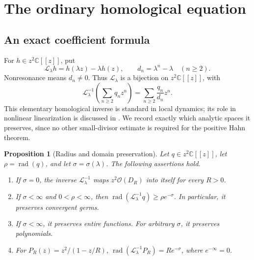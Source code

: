 \documentclass[11pt,a4paper]{article}
\numberwithin{equation}{section}
\newtheorem{proposition}[theorem]{Proposition}
\theoremstyle{definition}
\theoremstyle{remark}
\newcommand{\C}{\mathbb C}
\newcommand{\LL}{\mathcal L}
\newcommand{\rad}{\operatorname{rad}}
\begin{document}
\section{The ordinary homological equation}\label{sec:homological}

\subsection{An exact coefficient formula}

For $h\in z^2\C[[z]]$, put
\[
 \LL_\lambda h=h(\lambda z)-\lambda h(z),\qquad
 d_n=\lambda^n-\lambda\quad(n\ge2).
\]
Nonresonance means $d_n\ne0$. Thus $\LL_\lambda$ is a bijection on
$z^2\C[[z]]$, with
\begin{equation}\label{eq:homologicalinverse}
 \LL_\lambda^{-1}\!\left(\sum_{n\ge2}q_nz^n\right)
       =\sum_{n\ge2}\frac{q_n}{d_n}z^n.
\end{equation}
This elementary homological inverse is standard in local dynamics; its
role in nonlinear linearization is discussed in
\cite{Marmi,FauvetMenousSauzin}. We record exactly which analytic spaces
it preserves, since no other small-divisor estimate is required for the
positive Hahn theorem.

\begin{proposition}[Radius and domain preservation]\label{prop:homological}
Let $q\in z^2\C[[z]]$, let $\rho=\rad(q)$, and let $\sigma=\sigma(\lambda)$.
The following assertions hold.
\begin{enumerate}[label=(\roman*),leftmargin=2em]
\item If $\sigma=0$, the inverse $\LL_\lambda^{-1}$ maps
$z^2\mathcal O(D_R)$ into itself for every $R>0$.
\item If $\sigma<\infty$ and $0<\rho<\infty$, then
$\rad(\LL_\lambda^{-1}q)\ge\rho e^{-\sigma}$. In particular, it
preserves convergent germs.
\item If $\sigma<\infty$, it preserves entire functions.
For arbitrary $\sigma$, it preserves polynomials.
\item For $P_R(z)=z^2/(1-z/R)$,
$\rad(\LL_\lambda^{-1}P_R)=Re^{-\sigma}$,
where $e^{-\infty}=0$.
\end{enumerate}
\end{proposition}
\end{document}
